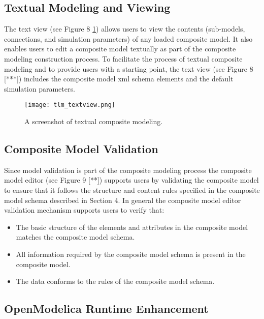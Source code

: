 \subsection{Textual Modeling and Viewing}
\label{sec:tlmtextual}

The text view (see Figure 8 \ref{fig:tlmtextview}) allows users to view the contents (sub-models, connections, and simulation
parameters) of any loaded composite model. It also enables users to edit a composite model textually as
part of the composite modeling construction process. To facilitate the process of textual composite modeling
and to provide users with a starting point, the text view (see Figure 8 [***]) includes the composite model \acrshort{xml}
schema elements and the default simulation parameters. 

\begin{figure}
	\texttt{[image: tlm\_textview.png]}
	\caption{A screenshot of textual composite modeling.}
	\label{fig:tlmtextview}
\end{figure}

\subsection{Composite Model Validation}
\label{sec:tlmvalidation}

Since model validation is part of the composite modeling process the composite model editor (see
Figure 9 [**]) supports users by validating the composite model to ensure that it follows the structure and
content rules specified in the composite model schema described in Section 4. In general the composite model
editor validation mechanism supports users to verify that: 

\begin{itemize}

\item The basic structure of the elements and attributes in the composite model matches the composite model schema.
\item All information required by the composite model schema is present in the composite model.
\item The data conforms to the rules of the composite model schema.

\end{itemize}

\subsection{OpenModelica Runtime Enhancement}
\label{sec:tlmruntime}

